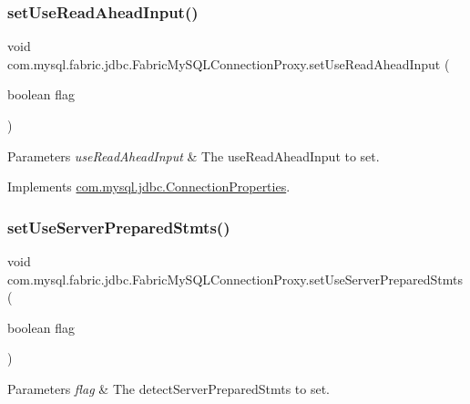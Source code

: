 \subsubsection{\texorpdfstring{set\+Use\+Read\+Ahead\+Input()}{setUseReadAheadInput()}}
{\footnotesize\ttfamily void com.\+mysql.\+fabric.\+jdbc.\+Fabric\+My\+S\+Q\+L\+Connection\+Proxy.\+set\+Use\+Read\+Ahead\+Input (\begin{DoxyParamCaption}\item[{boolean}]{flag }\end{DoxyParamCaption})}


\begin{DoxyParams}{Parameters}
{\em use\+Read\+Ahead\+Input} & The use\+Read\+Ahead\+Input to set. \\
\hline
\end{DoxyParams}


Implements \mbox{\hyperlink{interfacecom_1_1mysql_1_1jdbc_1_1_connection_properties_a4c83918a441a7c5938d0ec80a975b92b}{com.\+mysql.\+jdbc.\+Connection\+Properties}}.

\mbox{\label{classcom_1_1mysql_1_1fabric_1_1jdbc_1_1_fabric_my_s_q_l_connection_proxy_a826569072259e7f9c8ec525983c14f8f}} 
\subsubsection{\texorpdfstring{set\+Use\+Server\+Prepared\+Stmts()}{setUseServerPreparedStmts()}}
{\footnotesize\ttfamily void com.\+mysql.\+fabric.\+jdbc.\+Fabric\+My\+S\+Q\+L\+Connection\+Proxy.\+set\+Use\+Server\+Prepared\+Stmts (\begin{DoxyParamCaption}\item[{boolean}]{flag }\end{DoxyParamCaption})}


\begin{DoxyParams}{Parameters}
{\em flag} & The detect\+Server\+Prepared\+Stmts to set. \\
\hline
\end{DoxyParams}



